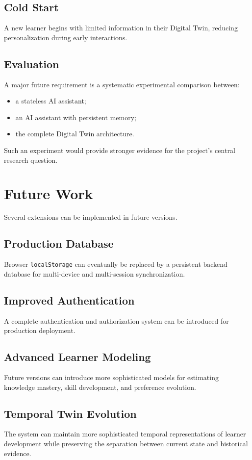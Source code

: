 \documentclass[12pt,a4paper]{article}
\begin{document}
\subsection{Cold Start}
A new learner begins with limited information in their Digital Twin, reducing personalization during early interactions.

\subsection{Evaluation}
A major future requirement is a systematic experimental comparison between:
\begin{itemize}[noitemsep,topsep=2pt]
    \item a stateless AI assistant;
    \item an AI assistant with persistent memory;
    \item the complete Digital Twin architecture.
\end{itemize}

Such an experiment would provide stronger evidence for the project's central research question.

\section{Future Work}
Several extensions can be implemented in future versions.

\subsection{Production Database}
Browser \texttt{localStorage} can eventually be replaced by a persistent backend database for multi-device and multi-session synchronization.

\subsection{Improved Authentication}
A complete authentication and authorization system can be introduced for production deployment.

\subsection{Advanced Learner Modeling}
Future versions can introduce more sophisticated models for estimating knowledge mastery, skill development, and preference evolution.

\subsection{Temporal Twin Evolution}
The system can maintain more sophisticated temporal representations of learner development while preserving the separation between current state and historical evidence.
\end{document}
